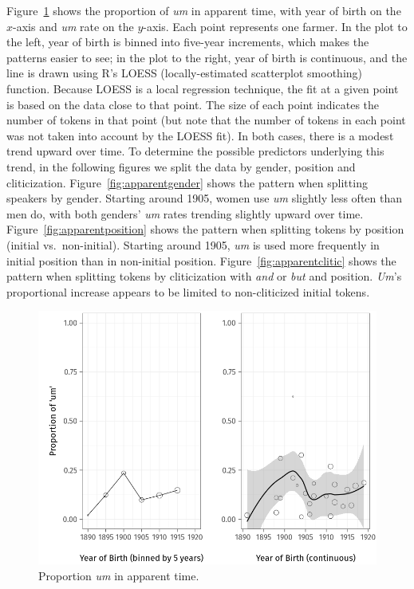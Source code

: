 \documentclass[11pt]{article}
\begin{document}
Figure~\ref{fig:apparenttime} shows the proportion of \emph{um} in apparent
time, with year of birth on the $x$-axis and \emph{um} rate on the $y$-axis.
Each point represents one farmer.
In the plot to the left, year of birth is binned into five-year increments,
which makes the patterns easier to see;
in the plot to the right, year of birth is continuous, and the line is drawn
using R's LOESS (locally-estimated scatterplot smoothing) function.
Because LOESS is a local regression technique, the fit at a given point is based
on the data close to that point.
The size of each point indicates the number of tokens in that point (but note
that the number of tokens in each point was not taken into account by the
LOESS fit).
In both cases, there is a modest trend upward over time.
To determine the possible predictors underlying this trend, in the following
figures we split the data by gender, position and cliticization.
Figure~\ref{fig:apparentgender} shows the pattern when splitting speakers by
gender.
Starting around 1905, women use \emph{um} slightly less often than men do, with
both genders' \emph{um} rates trending slightly upward over time.
Figure~\ref{fig:apparentposition} shows the pattern when splitting tokens by
position (initial vs.\ non-initial).
Starting around 1905, \emph{um} is used more frequently in initial position than
in non-initial position.
Figure~\ref{fig:apparentclitic} shows the pattern when splitting tokens by
cliticization with \emph{and} or \emph{but} and position.
\emph{Um}'s proportional increase appears to be limited to non-cliticized
initial tokens.

\begin{figure}[htpb]
    \centering
    \includegraphics[width=0.8\linewidth]{figures/apparenttime.png}
    \caption{Proportion \emph{um} in apparent time.}
    \label{fig:apparenttime}
\end{figure}
\end{document}
